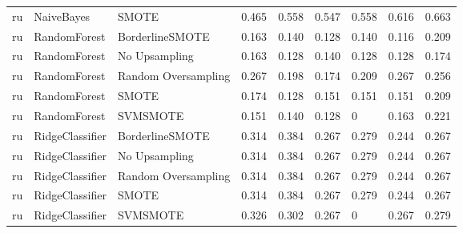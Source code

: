 \begin{tabular}{lllllllll}
      ru &                      NaiveBayes &                         SMOTE & 0.465 &                     0.558 &                 0.547 &                  0.558 &                                   0.616 &     0.663 \\
      ru &                    RandomForest &               BorderlineSMOTE & 0.163 &                     0.140 &                 0.128 &                  0.140 &                                   0.116 &     0.209 \\
      ru &                    RandomForest &                 No Upsampling & 0.163 &                     0.128 &                 0.140 &                  0.128 &                                   0.128 &     0.174 \\
      ru &                    RandomForest &           Random Oversampling & 0.267 &                     0.198 &                 0.174 &                  0.209 &                                   0.267 &     0.256 \\
      ru &                    RandomForest &                         SMOTE & 0.174 &                     0.128 &                 0.151 &                  0.151 &                                   0.151 &     0.209 \\
      ru &                    RandomForest &                      SVMSMOTE & 0.151 &                     0.140 &                 0.128 &                      0 &                                   0.163 &     0.221 \\
      ru &                 RidgeClassifier &               BorderlineSMOTE & 0.314 &                     0.384 &                 0.267 &                  0.279 &                                   0.244 &     0.267 \\
      ru &                 RidgeClassifier &                 No Upsampling & 0.314 &                     0.384 &                 0.267 &                  0.279 &                                   0.244 &     0.267 \\
      ru &                 RidgeClassifier &           Random Oversampling & 0.314 &                     0.384 &                 0.267 &                  0.279 &                                   0.244 &     0.267 \\
      ru &                 RidgeClassifier &                         SMOTE & 0.314 &                     0.384 &                 0.267 &                  0.279 &                                   0.244 &     0.267 \\
      ru &                 RidgeClassifier &                      SVMSMOTE & 0.326 &                     0.302 &                 0.267 &                      0 &                                   0.267 &     0.279 \\

\end{tabular}

